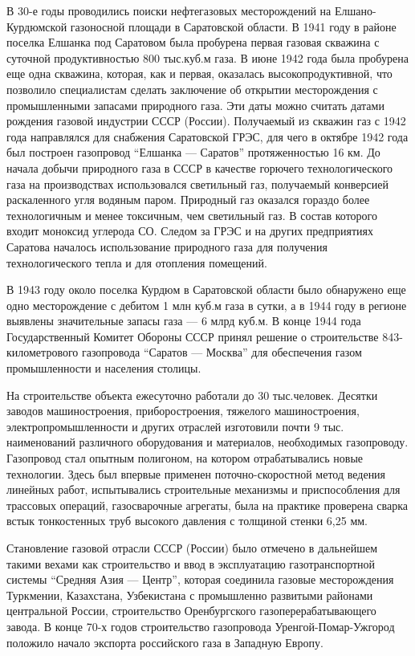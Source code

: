 В 30-е годы проводились поиски нефтегазовых месторождений на Елшано-Курдюмской газоносной площади в Саратовской области.
В 1941 году в районе поселка Елшанка под Саратовом была пробурена первая газовая скважина с суточной продуктивностью 800 тыс.куб.м газа.
В июне 1942 года была пробурена еще одна скважина, которая, как и первая, оказалась высокопродуктивной, что позволило специалистам сделать заключение об открытии месторождения с промышленными запасами природного газа.
Эти даты можно считать датами рождения газовой индустрии СССР (России).
Получаемый из скважин газ с 1942 года направлялся для снабжения Саратовской ГРЭС, для чего в октябре 1942 года был построен газопровод ``Елшанка --- Саратов'' протяженностью 16 км.
До начала добычи природного газа в СССР в качестве горючего технологического газа на производствах использовался светильный газ, получаемый конверсией раскаленного угля водяным паром.
Природный газ оказался гораздо более технологичным и менее токсичным, чем светильный газ.
В состав которого входит моноксид углерода СО.
Следом за ГРЭС и на других предприятиях Саратова началось использование природного газа для получения технологического тепла и для отопления помещений.

В 1943 году около поселка Курдюм в Саратовской области было обнаружено еще одно месторождение с дебитом 1 млн куб.м газа в сутки, а в 1944 году в регионе выявлены значительные запасы газа --- 6 млрд куб.м.
В конце 1944 года Государственный Комитет Обороны СССР принял решение о строительстве 843-километрового газопровода ``Саратов --- Москва'' для обеспечения газом промышленности и населения столицы.

На строительстве объекта ежесуточно работали до 30 тыс.человек.
Десятки заводов машиностроения, приборостроения, тяжелого машиностроения, электропромышленности и других отраслей изготовили почти 9 тыс. наименований различного оборудования и материалов, необходимых газопроводу.
Газопровод стал опытным полигоном, на котором отрабатывались новые технологии.
Здесь был впервые применен поточно-скоростной метод ведения линейных работ, испытывались строительные механизмы и приспособления для трассовых операций, газосварочные агрегаты, была на практике проверена сварка встык тонкостенных труб высокого давления с толщиной стенки 6,25 мм.

Становление газовой отрасли СССР (России) было отмечено в дальнейшем такими вехами как строительство и ввод в эксплуатацию газотранспортной системы ``Средняя Азия --- Центр'', которая соединила газовые месторождения Туркмении, Казахстана, Узбекистана с промышленно развитыми районами центральной России, строительство Оренбургского газоперерабатывающего завода.
В конце 70-х годов строительство газопровода Уренгой-Помар-Ужгород положило начало экспорта российского газа в Западную Европу.


